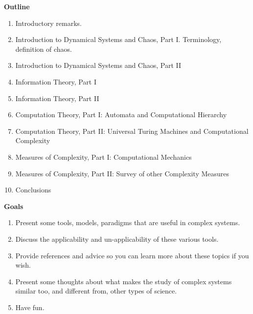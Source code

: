 \documentclass[%
  color,
  epsf,
  url,
  amssymb,
  semhelv,%
  portrait,%
  semlayer%
  ]{seminar}
\begin{document}
\begin{slide*}
\centerslidesfalse
\begin{center}
{\bf Outline}
\end{center}

\begin{enumerate}

    \item Introductory remarks.  
    \item Introduction to Dynamical Systems and Chaos, Part
    I. Terminology, definition of chaos.      
    \item Introduction to Dynamical Systems and Chaos, Part II 
    \item Information Theory, Part I 
    \item Information Theory, Part II 
    \item Computation Theory, Part I: Automata and Computational Hierarchy 
    \item Computation Theory, Part II: Universal Turing Machines and
    Computational Complexity 
    \item Measures of Complexity, Part I: Computational Mechanics 
    \item Measures of Complexity, Part II: Survey of other Complexity
    Measures  
    \item Conclusions 
\end{enumerate}

\end{slide*}


\begin{slide*}
\centerslidesfalse
\begin{center}
{\bf Goals}
\end{center}

\begin{enumerate}

\item  Present some tools, models, paradigms that are useful in
complex systems. 

\item Discuss the applicability and un-applicability of these various
tools.  

\item Provide references and advice so you can learn more about these
topics if you wish. 

\item Present some thoughts about what makes the study of complex
systems similar too, and different from, other types of science. 

\item Have fun. 

\end{enumerate}

\end{slide*}
\end{document}

